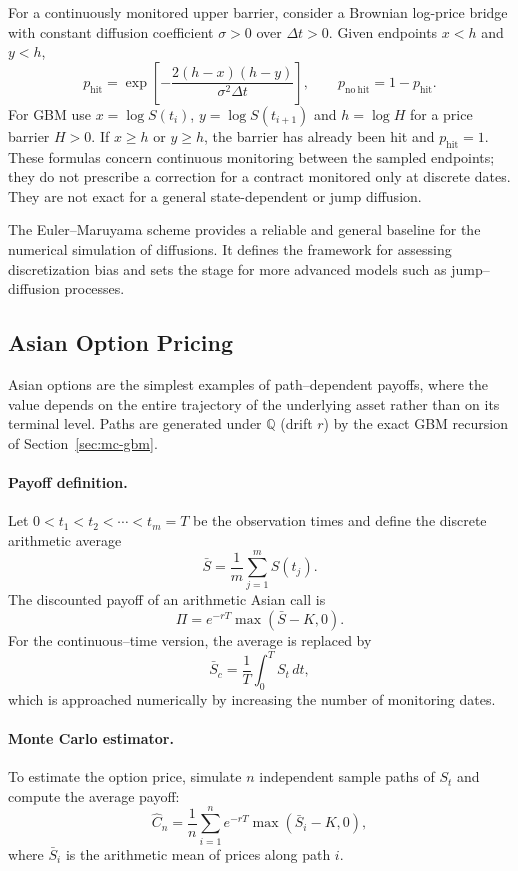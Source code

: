 For a continuously monitored upper barrier, consider a Brownian
log-price bridge with constant diffusion coefficient $\sigma>0$ over
$\Delta t>0$. Given endpoints $x<h$ and $y<h$,
\[
p_{\mathrm{hit}}=
\exp\!\left[-\frac{2(h-x)(h-y)}{\sigma^2\Delta t}\right],
\qquad p_{\mathrm{no\ hit}}=1-p_{\mathrm{hit}}.
\]
For GBM use $x=\log S(t_i)$, $y=\log S(t_{i+1})$ and $h=\log H$
for a price barrier $H>0$. If $x\ge h$ or $y\ge h$,
the barrier has already been hit and $p_{\mathrm{hit}}=1$. These formulas concern continuous
monitoring between the sampled endpoints; they do not prescribe a
correction for a contract monitored only at discrete dates. They are
not exact for a general state-dependent or jump diffusion.

\begin{remark}[Summary]
The Euler--Maruyama scheme provides a reliable and general baseline for the numerical simulation of diffusions.  
It defines the framework for assessing discretization bias and sets the stage for more advanced models such as jump--diffusion processes.
\end{remark}
\subsection{Asian Option Pricing} 

Asian options are the simplest examples of path--dependent payoffs, where the value depends on the entire trajectory of the underlying asset rather than on its terminal level.  
Paths are generated under $\mathbb Q$ (drift $r$) by the exact GBM recursion of Section~\ref{sec:mc-gbm}.

\paragraph{Payoff definition.}
Let \(0 < t_1 < t_2 < \cdots < t_m = T\) be the observation times and define the discrete arithmetic average
\[
\bar S = \frac{1}{m}\sum_{j=1}^{m} S(t_j).
\]
The discounted payoff of an arithmetic Asian call is
\[
\Pi = e^{-rT}\max(\bar S - K, 0).
\]
For the continuous--time version, the average is replaced by
\[
\bar S_c = \frac{1}{T}\int_0^T S_t\,dt,
\]
which is approached numerically by increasing the number of monitoring dates.

\paragraph{Monte Carlo estimator.}
To estimate the option price, simulate $n$ independent sample paths of \(S_t\) and compute the average payoff:
\[
\widehat{C}_n = \frac{1}{n}\sum_{i=1}^{n}
e^{-rT}\max(\bar S_i - K, 0),
\]
where $\bar S_i$ is the arithmetic mean of prices along path $i$.





